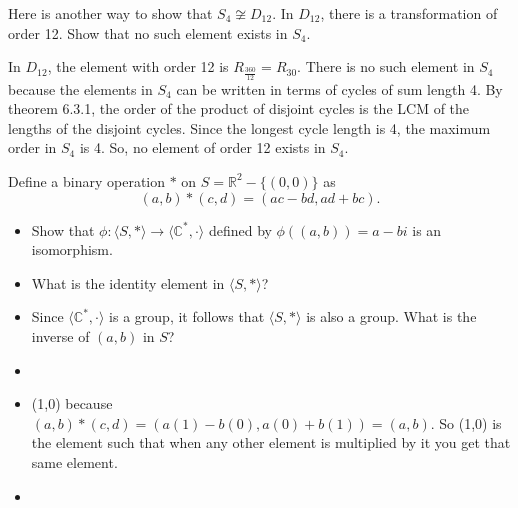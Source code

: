 \documentclass[titlepage]{article}
\newenvironment{problem}[2][Problem]{\begin{tcolorbox}\begin{trivlist}
\item[\hskip \labelsep {\bfseries #1}\hskip \labelsep {\bfseries #2.}]}{\end{trivlist}\end{tcolorbox}}
\begin{document}
\begin{problem}{7}
Here is another way to show that $S_4 \not \cong D_{12}$. In $D_{12}$, there is a transformation of order 12. Show that no such element exists in $S_4$.
\end{problem}
In $D_{12}$, the element with order 12 is $R_{\frac{360}{12}} = R_{30}$. There is no such element in $S_4$ because the elements in $S_4$ can be written in terms of cycles of sum length  4. By theorem 6.3.1, the order of the product of disjoint cycles is the LCM of the lengths of the disjoint cycles. Since the longest cycle length is 4, the maximum order in $S_4$ is 4. So, no element of order 12 exists in $S_4$.


\begin{problem}{8}
Define a binary operation $*$ on $S = \mathbb{R}^2 - \{(0,0)\}$ as
$$ (a,b) * (c,d) = (ac-bd, ad+bc).$$
\begin{itemize}
\item[(a)] Show that $\phi: \langle S, * \rangle \rightarrow \langle \mathbb{C}^*, \cdot \rangle$ defined by $\phi((a,b)) = a-bi$ is an isomorphism.
\item[(b)] What is the identity element in $\langle S, * \rangle$?
\item[(c)] Since $\langle \mathbb{C}^*, \cdot \rangle$ is a group, it follows that $\langle S, * \rangle$ is also a group. What is the inverse of $(a,b)$ in $S$?
\end{itemize}
\end{problem}
\begin{itemize}
\item[(a)]
\item[(b)](1,0) because $(a,b) * (c,d) = (a(1)-b(0), a(0) + b(1)) = (a,b).$ So (1,0) is the element such that when any other element is multiplied by it you get that same element.
\item[(c)]
\end{itemize}
\end{document}
